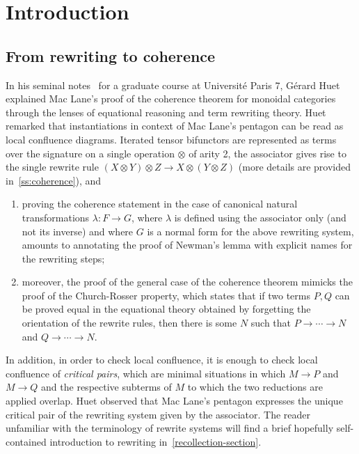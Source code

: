 
\section*{Introduction} 
\label{s:introduction}



\subsection*{From rewriting to coherence}
In his seminal notes~\cite{Huet-notes-cat} for a graduate course at Université Paris 7, Gérard Huet explained Mac Lane's proof of the coherence theorem for monoidal categories through the lenses of equational reasoning and  term rewriting theory. 
Huet remarked that instantiations in context of Mac Lane's pentagon can be read as local confluence diagrams. Iterated tensor bifunctors  are represented as terms over the signature on a single operation $\otimes$ of arity 2, the associator gives rise to the single rewrite rule $(X\otimes Y)\otimes Z\to X\otimes(Y\otimes Z)$ (more details are provided in~\cref{ss:coherence}), and
\begin{enumerate}
\item proving  the coherence statement in the case of canonical natural transformations $\lambda:F\rightarrow G$, where $\lambda$ is defined using the associator only (and not its inverse) and where $G$ is a normal form for the above rewriting system, amounts to annotating the proof of Newman's lemma with  explicit names for the rewriting steps;
\item moreover, the proof of the general case of the coherence theorem mimicks the proof of the Church-Rosser property, which states that if two terms $P,Q$ can be proved equal in the equational theory obtained by forgetting the orientation of the rewrite rules, then there is some $N$ such that $P\rightarrow\cdots\rightarrow N$ and
$Q\rightarrow\cdots\rightarrow N$.
\end{enumerate}
In addition, in order to check local confluence, it is enough to check local confluence of {\em critical pairs}, which are minimal situations in which $M\rightarrow P$ and $M\rightarrow Q$ and the respective subterms of $M$ to which the two reductions are applied overlap. Huet observed that Mac Lane's pentagon expresses the unique critical pair of  the rewriting system given by the associator. The reader unfamiliar with the terminology of rewrite systems will find a brief hopefully self-contained introduction to rewriting in~\cref{recollection-section}.


